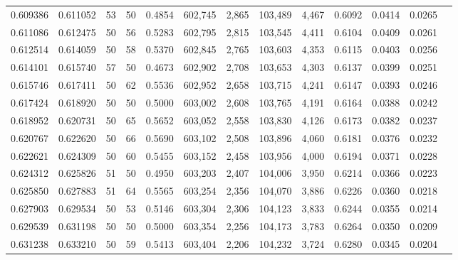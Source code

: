 \begin{tabular}{rrrrrrrrrrrrr}
0.609386 & 0.611052 &    53 &  50 &                                     0.4854 & 602,745 &   2,865 & 103,489 &   4,467 & 0.6092 & 0.0414 & 0.0265 \\
0.611086 & 0.612475 &    50 &  56 &                                     0.5283 & 602,795 &   2,815 & 103,545 &   4,411 & 0.6104 & 0.0409 & 0.0261 \\
0.612514 & 0.614059 &    50 &  58 &                                     0.5370 & 602,845 &   2,765 & 103,603 &   4,353 & 0.6115 & 0.0403 & 0.0256 \\
0.614101 & 0.615740 &    57 &  50 &                                     0.4673 & 602,902 &   2,708 & 103,653 &   4,303 & 0.6137 & 0.0399 & 0.0251 \\
0.615746 & 0.617411 &    50 &  62 &                                     0.5536 & 602,952 &   2,658 & 103,715 &   4,241 & 0.6147 & 0.0393 & 0.0246 \\
0.617424 & 0.618920 &    50 &  50 &                                     0.5000 & 603,002 &   2,608 & 103,765 &   4,191 & 0.6164 & 0.0388 & 0.0242 \\
0.618952 & 0.620731 &    50 &  65 &                                     0.5652 & 603,052 &   2,558 & 103,830 &   4,126 & 0.6173 & 0.0382 & 0.0237 \\
0.620767 & 0.622620 &    50 &  66 &                                     0.5690 & 603,102 &   2,508 & 103,896 &   4,060 & 0.6181 & 0.0376 & 0.0232 \\
0.622621 & 0.624309 &    50 &  60 &                                     0.5455 & 603,152 &   2,458 & 103,956 &   4,000 & 0.6194 & 0.0371 & 0.0228 \\
0.624312 & 0.625826 &    51 &  50 &                                     0.4950 & 603,203 &   2,407 & 104,006 &   3,950 & 0.6214 & 0.0366 & 0.0223 \\
0.625850 & 0.627883 &    51 &  64 &                                     0.5565 & 603,254 &   2,356 & 104,070 &   3,886 & 0.6226 & 0.0360 & 0.0218 \\
0.627903 & 0.629534 &    50 &  53 &                                     0.5146 & 603,304 &   2,306 & 104,123 &   3,833 & 0.6244 & 0.0355 & 0.0214 \\
0.629539 & 0.631198 &    50 &  50 &                                     0.5000 & 603,354 &   2,256 & 104,173 &   3,783 & 0.6264 & 0.0350 & 0.0209 \\
0.631238 & 0.633210 &    50 &  59 &                                     0.5413 & 603,404 &   2,206 & 104,232 &   3,724 & 0.6280 & 0.0345 & 0.0204 \\

\end{tabular}
